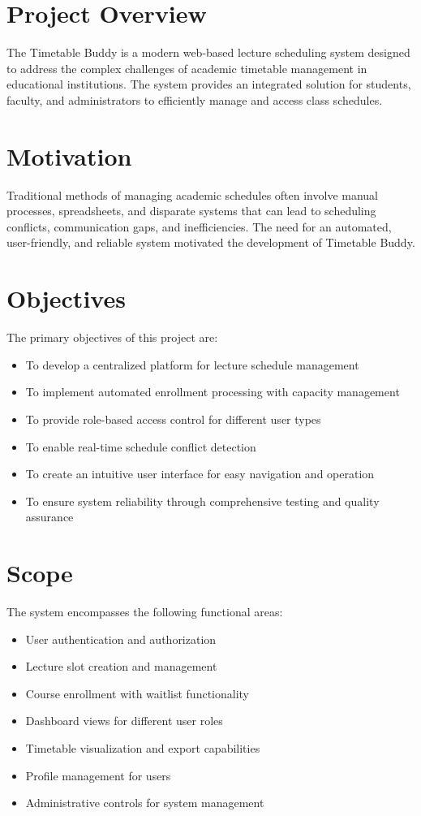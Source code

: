 \documentclass[12pt,a4paper]{report}
\begin{document}
\section{Project Overview}
The Timetable Buddy is a modern web-based lecture scheduling system designed to address the complex challenges of academic timetable management in educational institutions. The system provides an integrated solution for students, faculty, and administrators to efficiently manage and access class schedules.

\section{Motivation}
Traditional methods of managing academic schedules often involve manual processes, spreadsheets, and disparate systems that can lead to scheduling conflicts, communication gaps, and inefficiencies. The need for an automated, user-friendly, and reliable system motivated the development of Timetable Buddy.

\section{Objectives}
The primary objectives of this project are:
\begin{itemize}[leftmargin=*]
    \item To develop a centralized platform for lecture schedule management
    \item To implement automated enrollment processing with capacity management
    \item To provide role-based access control for different user types
    \item To enable real-time schedule conflict detection
    \item To create an intuitive user interface for easy navigation and operation
    \item To ensure system reliability through comprehensive testing and quality assurance
\end{itemize}

\section{Scope}
The system encompasses the following functional areas:
\begin{itemize}[leftmargin=*]
    \item User authentication and authorization
    \item Lecture slot creation and management
    \item Course enrollment with waitlist functionality
    \item Dashboard views for different user roles
    \item Timetable visualization and export capabilities
    \item Profile management for users
    \item Administrative controls for system management
\end{itemize}
\end{document}
